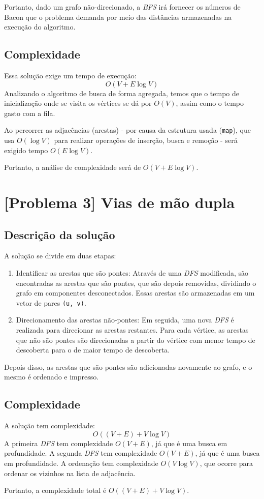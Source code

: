 \documentclass[12pt, letterpaper]{article}
\begin{document}
            Portanto, dado um grafo não-direcionado, a \emph{BFS} irá fornecer os números de Bacon que o problema demanda por meio das distâncias armazenadas na execução do algoritmo.

        \subsection{Complexidade}
            Essa solução exige um tempo de execução:
            $$ O(V + E\log{V}) $$
            Analizando o algoritmo de busca de forma agregada, temos que o tempo de inicialização onde se visita os vértices se dá por $O(V)$, assim como o tempo gasto com a fila.

            Ao percorrer as adjacências (arestas) - por causa da estrutura usada (\verb|map|), que usa $O(\log{V})$ para realizar operações de inserção, busca e remoção - será exigido tempo $O(E\log{V})$.

            Portanto, a análise de complexidade será de $O(V + E\log{V})$.
    \section{[Problema 3] Vias de mão dupla}
        \subsection{Descrição da solução}
            A solução se divide em duas etapas:
            \begin{enumerate}
                \item Identificar as arestas que são pontes:
                    Através de uma \emph{DFS} modificada, são encontradas as arestas que são pontes, que são depois removidas, dividindo o grafo em componentes desconectados. Essas arestas são armazenadas em um vetor de pares \verb|(u, v)|.
                \item Direcionamento das arestas não-pontes:
                    Em seguida, uma nova \emph{DFS} é realizada para direcionar as arestas restantes. Para cada vértice, as arestas que não são pontes são direcionadas a partir do vértice com menor tempo de descoberta para o de maior tempo de descoberta.
            \end{enumerate}
            Depois disso, as arestas que são pontes são adicionadas novamente ao grafo, e o mesmo é ordenado e impresso.

        \subsection{Complexidade}
            A solução tem complexidade:
            $$ O((V + E) + V\log{V}) $$
            A primeira \emph{DFS} tem complexidade $O(V + E)$, já que é uma busca em profundidade. A segunda \emph{DFS} tem complexidade $O(V + E)$, já que é uma busca em profundidade. A ordenação tem complexidade $O(V\log{V})$, que ocorre para ordenar os vizinhos na lista de adjacência.

            Portanto, a complexidade total é $O((V + E) + V\log{V})$.
\end{document}
